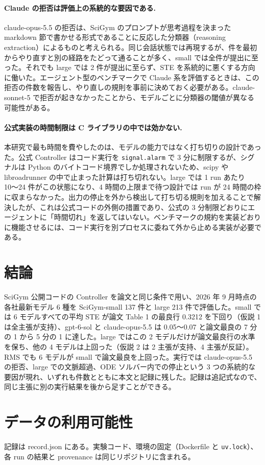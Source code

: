 \documentclass{article}
\providecommand{\unverified}[1]{#1}
\providecommand{\airasrecordlink}[1]{#1}
\begin{document}
\paragraph{Claude の拒否は評価上の系統的な要因である.}
claude-opus-5.5 の拒否は、SciGym のプロンプトが思考過程を決まった markdown 節で書かせる形式であることに反応した分類器（reasoning extraction）によるものと考えられる。同じ会話状態では再現するが、件を最初からやり直すと別の経路をたどって通ることが多く、small では全件が提出に至った。それでも large では 2 件が提出に至らず、STE を系統的に悪くする方向に働いた。エージェント型のベンチマークで Claude 系を評価するときは、この拒否の件数を報告し、やり直しの規則を事前に決めておく必要がある。claude-sonnet-5 で拒否が起きなかったことから、モデルごとに分類器の閾値が異なる可能性がある。

\paragraph{公式実装の時間制限は C ライブラリの中では効かない.}
本研究で最も時間を費やしたのは、モデルの能力ではなく打ち切りの設計であった。公式 Controller はコード実行を \texttt{signal.alarm} で 3 分に制限するが、シグナルは Python のバイトコード境界でしか処理されないため、scipy や libroadrunner の中で止まった計算は打ち切れない。large では 1 run あたり 10〜24 件がこの状態になり、4 時間の上限まで待つ設計では run が 24 時間の枠に収まらなかった。出力の停止を外から検出して打ち切る規則を加えることで解決したが、これは公式コードの外側の措置であり、公式の 3 分制限どおりにエージェントに「時間切れ」を返してはいない。ベンチマークの規約を実装どおりに機能させるには、コード実行を別プロセスに委ねて外から止める実装が必要である。

\section{結論}
\label{sec:conclusion}
SciGym 公開コードの Controller を論文と同じ条件で用い、2026 年 9 月時点の各社最新モデル 6 種を SciGym-small 137 件と large 213 件で評価した。small では 6 モデルすべての平均 STE が論文 Table 1 の最良行 \unverified{0.3212} を下回り（仮説 1 は全主張が支持）、gpt-6-sol と claude-opus-5.5 は 0.05〜0.07 と論文最良の 7 分の 1 から 5 分の 1 に達した。large ではこの 2 モデルだけが論文最良行の水準を保ち、他の 4 モデルは上回った（仮説 2 は 2 主張が支持、4 主張が反証）。RMS でも 6 モデルが small で論文最良を上回った。実行では claude-opus-5.5 の拒否、large での文脈超過、ODE ソルバー内での停止という 3 つの系統的な要因が現れ、いずれも件数とともに本文と記録に残した。記録は追記式なので、同じ主張に別の実行結果を後から足すことができる。

\section*{データの利用可能性}
記録は \airasrecordlink{record.json} にある。実験コード、環境の固定（Dockerfile と \texttt{uv.lock}）、各 run の結果と provenance は同じリポジトリに含まれる。



\end{document}
